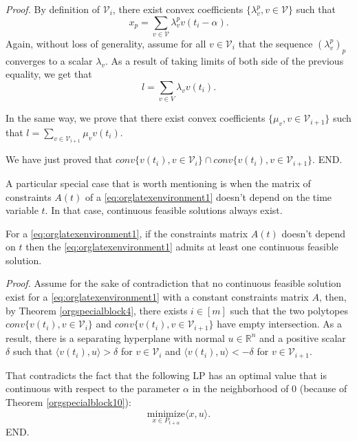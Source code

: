 \documentclass[moor]{informs1}
\renewenvironment{proof}{\emph{Proof.}}{END.}
\begin{document}
\begin{proof}
By definition of \(\mathcal V_i\), there exist convex coefficients \(\{\lambda_v^p, v \in \mathcal V\}\) such that $$x_p = \sum_{v \in \mathcal V}\lambda^p_v v(t_i-\alpha).$$
Again, without loss of generality, assume for all \(v \in \mathcal V_i\) that the sequence \((\lambda_v^p)_p\) converges to a scalar \(\lambda_v\). As a result of taking limits of both side of the previous equality, we get that
$$l = \sum_{v \in V} \lambda_v v(t_i).$$

In the same way, we prove that there exist convex coefficients \(\{\mu_v, v \in \mathcal V_{i+1}\}\) such that \(l = \sum_{v \in \mathcal V_{i+1}} \mu_v v(t_i)\).

We have just proved that \(conv \{ v(t_{i}), v \in \mathcal V_i\} \cap conv \{ v(t_{i}), v \in \mathcal V_{i+1}\}\).
\end{proof}

A particular special case that is worth mentioning is when the matrix of constraints \(A(t)\) of a \ref{eq:orglatexenvironment1} doesn't depend on the time variable \(t\). In that case, continuous feasible solutions always exist.

\begin{thm}
For a \ref{eq:orglatexenvironment1}, if the constraints matrix \(A(t)\) doesn't depend on \(t\) then the  \ref{eq:orglatexenvironment1} admits at least one continuous feasible solution.
\label{orgspecialblock6}

\end{thm}

\begin{proof}
Assume for the sake of contradiction that no continuous feasible solution exist for a \ref{eq:orglatexenvironment1} with a constant constraints matrix \(A\), then, by Theorem \ref{orgspecialblock4}, there  exists \(i \in [m]\) such that the two polytopes \(conv \{ v(t_{i}), v \in \mathcal V_i\}\) and \(conv \{ v(t_{i}), v \in \mathcal V_{i+1}\}\) have empty intersection. As a result, there is a separating hyperplane with normal \(u \in \mathbb R^n\) and a positive scalar \(\delta\) such that \(\langle v(t_i) , u \rangle > \delta\) for \(v \in \mathcal V_i\) and \(\langle v(t_i) , u \rangle < -\delta\) for \(v \in \mathcal V_{i+1}\).


That contradicts the fact that the following LP has an optimal value that is continuous with respect to the parameter \(\alpha\) in the neighborhood of 0 (because of Theorem \ref{orgspecialblock10}):
$$\underset{x \in P_{t+\alpha}}{\text{minimize}} \langle x, u \rangle.$$
\end{proof}
\end{document}
